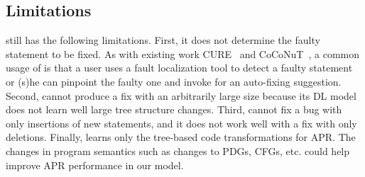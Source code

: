 \subsection{Limitations}
\label{sec:limitations}


{\tool} still has the following limitations. First, it does not
determine the faulty statement to be fixed. As with existing work
CURE~\cite{cure-icse21} and CoCoNuT~\cite{lutellier2020coconut}, a
common usage of {\tool} is that a user uses a fault localization tool
to detect a faulty statement or (s)he can pinpoint the faulty one and
invoke {\tool} for an auto-fixing suggestion. Second, {\tool} cannot
produce a fix with an arbitrarily large size because its DL model does
not learn well large tree structure changes. Third, {\tool} cannot fix
a bug with only insertions of new statements, and it does not work
well with a fix with only deletions.
Finally, {\tool} learns only the tree-based code transformations for
APR. The changes in program semantics such as changes to PDGs, CFGs,
etc. could help improve APR performance in our model.

